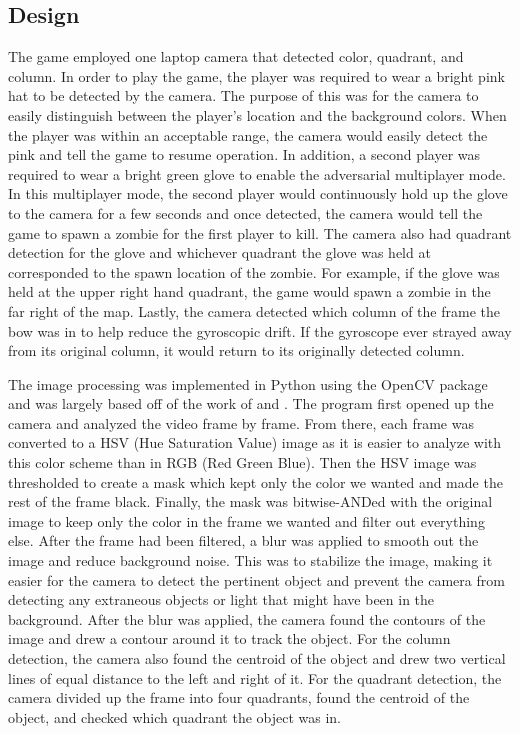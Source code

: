 \documentclass[titlepage, 12pt]{scrartcl}
\begin{document}
    \subsection{Design}
    The game employed one laptop camera that detected color, quadrant, and column. In order to play the game, the player was required to wear a bright pink hat to be detected by the camera. The purpose of this was for the camera to easily distinguish between the player's location and the background colors. When the player was within an acceptable range, the camera would easily detect the pink and tell the game to resume operation. In addition, a second player was required to wear a bright green glove to enable the adversarial multiplayer mode. In this multiplayer mode, the second player would continuously hold up the glove to the camera for a few seconds and once detected, the camera would tell the game to spawn a zombie for the first player to kill. The camera also had quadrant detection for the glove and whichever quadrant the glove was held at corresponded to the spawn location of the zombie. For example, if the glove was held at the upper right hand quadrant, the game would spawn a zombie in the far right of the map. Lastly, the camera detected which column of the frame the bow was in to help reduce the gyroscopic drift. If the gyroscope ever strayed away from its original column, it would return to its originally detected column.\par
    The image processing was implemented in Python using the OpenCV package and was largely based off of the work of \cite{Mordvintsev_2013} and \cite{Sharma}. The program first opened up the camera and analyzed the video frame by frame. From there, each frame was converted to a HSV (Hue Saturation Value) image as it is easier to analyze with this color scheme than in RGB (Red Green Blue). Then the HSV image was thresholded to create a mask which kept only the color we wanted and made the rest of the frame black. Finally, the mask was bitwise-ANDed with the original image to keep only the color in the frame we wanted and filter out everything else. After the frame had been filtered, a blur was applied to smooth out the image and reduce background noise. This was to stabilize the image, making it easier for the camera to detect the pertinent object and prevent the camera from detecting any extraneous objects or light that might have been in the background. After the blur was applied, the camera found the contours of the image and drew a contour around it to track the object. For the column detection, the camera also found the centroid of the object and drew two vertical lines of equal distance to the left and right of it. For the quadrant detection, the camera divided up the frame into four quadrants, found the centroid of the object, and checked which quadrant the object was in.
\end{document}
